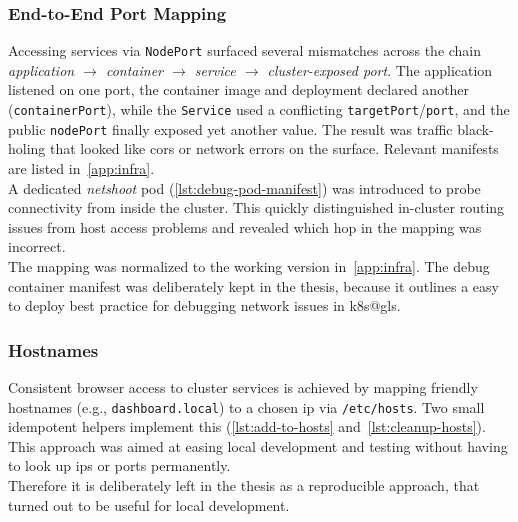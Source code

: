 \documentclass[11pt, a4paper, oneside, listof=totoc]{scrartcl}
\begin{document}
            \subsubsection{End-to-End Port Mapping}\label{subsubsec:e2eportmapping}
                Accessing services via \texttt{NodePort} surfaced several mismatches across the
                chain \emph{application $\rightarrow$ container $\rightarrow$ service $\rightarrow$
                cluster-exposed port}.
                The application listened on one port, the container image and deployment declared
                another (\texttt{containerPort}), while the \texttt{Service} used a conflicting
                \texttt{targetPort}/\texttt{port}, and the public \texttt{nodePort} finally exposed
                yet another value.
                The result was traffic black-holing that looked like \gls{cors} or network errors on
                the surface.
                Relevant manifests are listed in~\autoref{app:infra}.\\
                A dedicated \emph{netshoot} pod (\autoref{lst:debug-pod-manifest}) was introduced to
                probe connectivity from inside the cluster.
                This quickly distinguished in-cluster routing issues from host access problems and
                revealed which hop in the mapping was incorrect.\\
                The mapping was normalized to the working version in~\autoref{app:infra}.
                The debug container manifest was deliberately kept in the thesis, because it
                outlines a easy to deploy best practice for debugging network issues in
                \gls{k8s@gls}.

            \subsubsection{Hostnames}\label{subsubsec:hostnames}
                Consistent browser access to cluster services is achieved by mapping friendly
                hostnames (e.g., \texttt{dashboard.local}) to a chosen \gls{ip} via
                \texttt{/etc/hosts}.
                Two small idempotent helpers implement this
                (\autoref{lst:add-to-hosts} and~\autoref{lst:cleanup-hosts}).
                This approach was aimed at easing local development and testing without having to
                look up \glspl{ip} or ports permanently.\\
                Therefore it is deliberately left in the thesis as a reproducible approach, that
                turned out to be useful for local development.
\end{document}
